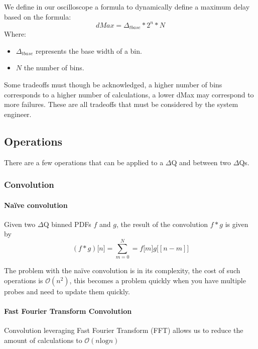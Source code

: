 We define in our oscilloscope a formula to dynamically define a maximum delay based on the formula:
\begin{equation}
    dMax = \Delta_{t base} * 2^n * N  
    \label{eq:dMax}
\end{equation}
Where:
\begin{itemize}
    \item $\Delta_{t base}$ represents the base width of a bin.
    \item $N$ the number of bins.
\end{itemize}


Some tradeoffs must though be acknowledged, a higher number of bins corresponds to a higher number of calculations, a lower dMax may correspond to more failures. These are all tradeoffs that must be considered by the system engineer.

\subsection{Operations}

There are a few operations that can be applied to a $\Delta$Q and between two $\Delta$Qs.

        \subsubsection{Convolution}
        
        \paragraph{Naïve convolution}
        Given two $\Delta$Q binned PDFs $f$ and $g$, the result of the convolution $f * g$ is given by 
        \begin{equation}
            (f * g)\lbrack n \rbrack = \sum_{m = 0}^{N} = f\lbrack m \rbrack g \lbrack [n - m] \rbrack  
            \label{eq:discconv}
        \end{equation}

        The problem with the naïve convolution is in its complexity, the cost of such operations is $\mathcal{O}(n^2)$, this becomes a problem quickly when you have multiple probes and need to update them quickly. 

        \paragraph{Fast Fourier Transform Convolution}

        Convolution leveraging Fast Fourier Transform (FFT) allows us to reduce the amount of calculations to $\mathcal{O}(n \text{log} n)$ 
